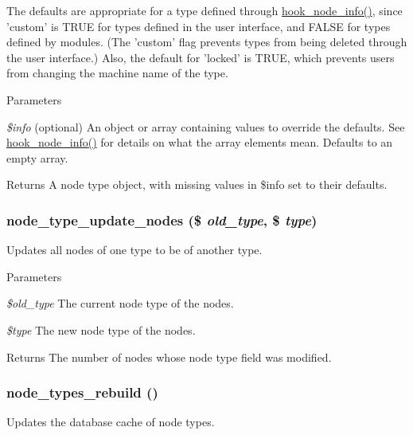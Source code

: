 The defaults are appropriate for a type defined through \hyperlink{group__node__api__hooks_ga3b6ad51d7815d1cdd093b0e0f350cbd0}{hook\_\-node\_\-info()}, since 'custom' is TRUE for types defined in the user interface, and FALSE for types defined by modules. (The 'custom' flag prevents types from being deleted through the user interface.) Also, the default for 'locked' is TRUE, which prevents users from changing the machine name of the type.


\begin{DoxyParams}{Parameters}
\item[{\em \$info}](optional) An object or array containing values to override the defaults. See \hyperlink{group__node__api__hooks_ga3b6ad51d7815d1cdd093b0e0f350cbd0}{hook\_\-node\_\-info()} for details on what the array elements mean. Defaults to an empty array.\end{DoxyParams}
\begin{DoxyReturn}{Returns}
A node type object, with missing values in \$info set to their defaults. 
\end{DoxyReturn}
\hypertarget{node_8module_a03c4318dce6050b7330af9cea8f3e420}{
\subsubsection[{node\_\-type\_\-update\_\-nodes}]{\setlength{\rightskip}{0pt plus 5cm}node\_\-type\_\-update\_\-nodes (\$ {\em old\_\-type}, \/  \$ {\em type})}}
\label{node_8module_a03c4318dce6050b7330af9cea8f3e420}
Updates all nodes of one type to be of another type.


\begin{DoxyParams}{Parameters}
\item[{\em \$old\_\-type}]The current node type of the nodes. \item[{\em \$type}]The new node type of the nodes.\end{DoxyParams}
\begin{DoxyReturn}{Returns}
The number of nodes whose node type field was modified. 
\end{DoxyReturn}
\hypertarget{node_8module_a0d871bf17b30ff5048cbc1abff3a075a}{
\subsubsection[{node\_\-types\_\-rebuild}]{\setlength{\rightskip}{0pt plus 5cm}node\_\-types\_\-rebuild ()}}
\label{node_8module_a0d871bf17b30ff5048cbc1abff3a075a}
Updates the database cache of node types.

